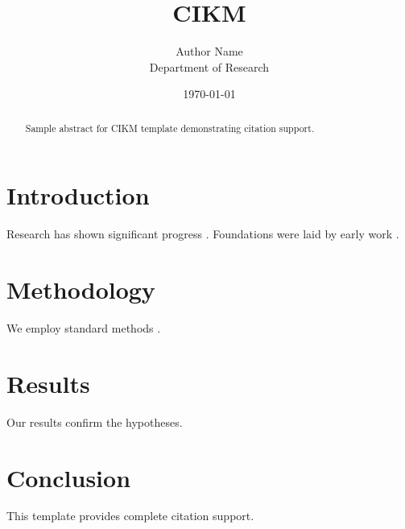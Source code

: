 \documentclass{article}
\title{CIKM}
\author{Author Name \\ \small Department of Research}
\date{\today}
\begin{document}
\maketitle

\begin{abstract}
Sample abstract for CIKM template demonstrating citation support.
\end{abstract}

\section{Introduction}
Research has shown significant progress \citep{einstein1905}. Foundations were laid by early work \citep{turing1950}.

\section{Methodology}
We employ standard methods \citep{knuth1984}.

\section{Results}
Our results confirm the hypotheses.

\section{Conclusion}
This template provides complete citation support.



\end{document}
